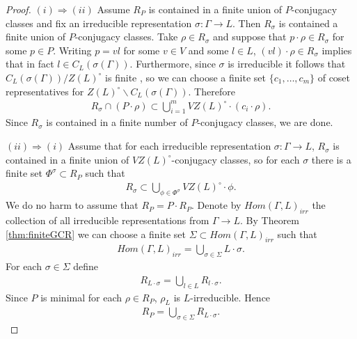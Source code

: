 \begin{proof}\quad

  $(i) \Rightarrow (ii)$ Assume $R_P$ is contained in a finite union of $P$-conjugacy classes and fix an irreducible representation $\sigma : \Gamma \rightarrow L$. Then $R_{\sigma}$ is contained a finite union of $P$-conjugacy classes. Take $\rho \in R_{\sigma}$ and suppose that $p \cdot \rho \in R_{\sigma}$ for some $p \in P$. Writing $p = vl$ for some $v \in V$ and some $l \in L$, $(vl) \cdot \rho \in R_{\sigma}$ implies that in fact $l \in C_L(\sigma(\Gamma))$. Furthermore, since $\sigma$ is irreducible it follows that $C_L(\sigma(\Gamma))/Z(L)^\circ$ is finite \cite[Lemma 6.2]{martin2003reductive}, so we can choose a finite set $\{c_1, \ldots, c_m\}$ of coset representatives for $Z(L)^\circ\backslash C_L(\sigma(\Gamma))$. Therefore
  \begin{align*}
    R_{\sigma} \cap (P \cdot \rho) \subset \bigcup_{i = 1}^{m} VZ(L)^\circ \cdot \left( c_i \cdot \rho \right).
  \end{align*}
  Since $R_{\sigma}$ is contained in a finite number of $P$-conjugacy classes, we are done.

  $(ii) \Rightarrow (i)$ Assume that for each irreducible representation $\sigma : \Gamma \rightarrow L$, $R_{\sigma}$ is contained in a finite union of $VZ(L)^\circ$-conjugacy classes, so for each $\sigma$ there is a finite set $\Phi^\sigma \subset R_P$ such that
  \begin{align*}
    R_\sigma \subset \bigcup_{\phi \in \Phi^\sigma} VZ(L)^\circ \cdot \phi.
  \end{align*}
  We do no harm to assume that $R_P = P \cdot R_P$. Denote by $Hom(\Gamma, L)_{irr}$ the collection of all irreducible representations from $\Gamma \rightarrow L$. By Theorem \ref{thm:finiteGCR} we can choose a finite set $\Sigma \subset Hom(\Gamma, L)_{irr}$ such that
  \begin{align*}
    Hom(\Gamma, L)_{irr} = \bigcup_{\sigma \in \Sigma} L \cdot \sigma.
  \end{align*}
  For each $\sigma \in \Sigma$ define 
  \begin{align*}
    R_{L \cdot \sigma} = \bigcup_{l \in L} R_{l \cdot \sigma}.
  \end{align*}
  Since $P$ is minimal for each $\rho \in R_P$, $\rho_L$ is $L$-irreducible. Hence
  \begin{align*}
    R_P = \bigcup_{\sigma \in \Sigma} R_{L \cdot \sigma}.
  \end{align*}


\end{proof}
